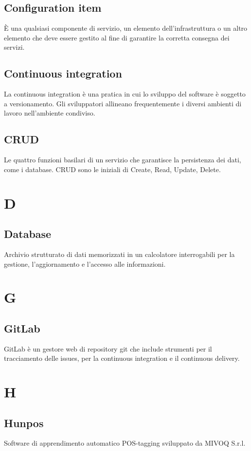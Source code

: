 {	\subsection{Configuration item}
	\`E una qualsiasi componente di servizio, un elemento dell'infrastruttura o un altro elemento che deve essere gestito al fine di garantire la corretta consegna dei servizi.
	
	
	\subsection{Continuous integration}
	La continuous integration è una pratica in cui lo sviluppo del software è soggetto a versionamento. Gli sviluppatori allineano frequentemente i diversi ambienti di lavoro nell'ambiente condiviso.
	
	\subsection{CRUD}
	Le quattro funzioni basilari di un servizio che garantisce la persistenza dei dati, come i database. CRUD sono le iniziali di Create, Read, Update, Delete.
	
	\section{D}
	\subsection{Database}
	Archivio strutturato di dati memorizzati in un calcolatore interrogabili per la gestione, l'aggiornamento e l'accesso alle informazioni.
	
	\section{G}
	\subsection{GitLab} 
	GitLab è un gestore web di repository git che include strumenti per il tracciamento delle issues, per la continuous integration e il continuous delivery.
	
	\section{H}
	\subsection{Hunpos}
	Software di apprendimento automatico POS-tagging sviluppato da MIVOQ S.r.l.
	
}
